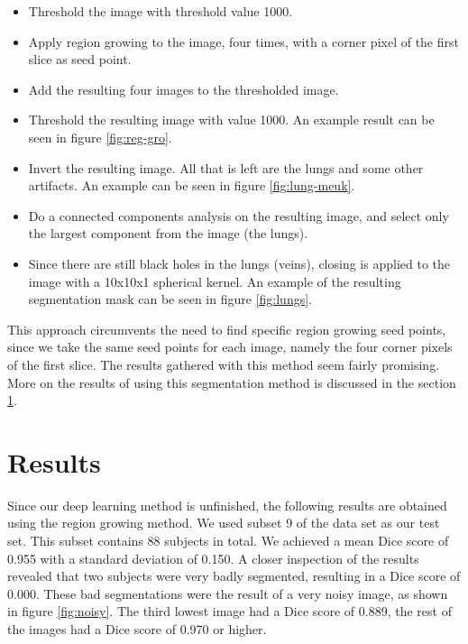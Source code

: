 \documentclass[a4paper,10pt]{article}
\numberwithin{equation}{section} %
\numberwithin{figure}{section} %
\numberwithin{table}{section} %
\begin{document}
\begin{itemize}
\item Threshold the image with threshold value 1000.
\item Apply region growing to the image, four times, with a corner pixel of the first slice as seed point.
\item Add the resulting four images to the thresholded image.
\item Threshold the resulting image with value 1000. An example result can be seen in figure \ref{fig:reg-gro}.
\item Invert the resulting image. All that is left are the lungs and some other artifacts. An example can be seen in figure \ref{fig:lung-meuk}.
\item Do a connected components analysis on the resulting image, and select only the largest component from the image (the lungs).
\item Since there are still black holes in the lungs (veins), closing is applied to the image with a 10x10x1 spherical kernel. An example of the resulting segmentation mask can be seen in figure \ref{fig:lungs}.
\end{itemize}

\noindent This approach circumvents the need to find specific region growing seed points, since we take the same seed points for each image, namely the four corner pixels of the first slice. The results gathered with this method seem fairly promising. More on the results of using this segmentation method is discussed in the section \ref{sec:results}.


\section{Results}
\label{sec:results}
Since our deep learning method is unfinished, the following results are obtained using the region growing method. We used subset 9 of the data set as our test set. This subset contains 88 subjects in total. We achieved a mean Dice score of 0.955 with a standard deviation of 0.150. A closer inspection of the results revealed that two subjects were very badly segmented, resulting in a Dice score of 0.000. These bad segmentations were the result of a very noisy image, as shown in figure \ref{fig:noisy}. The third lowest image had a Dice score of 0.889, the rest of the images had a Dice score of 0.970 or higher. 
\end{document}
